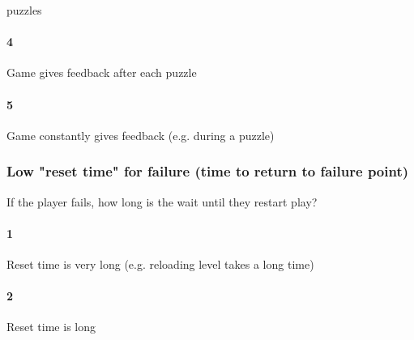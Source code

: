 puzzles\paragraph{4}Game gives feedback after each puzzle\paragraph{5}Game constantly gives feedback (e.g. during a puzzle)\subsubsection{Low "reset time" for failure (time to return to failure point)}If the player fails, how long is the wait until they restart play?\paragraph{1}Reset time is very long (e.g. reloading level takes a long time)\paragraph{2}Reset time is long 
